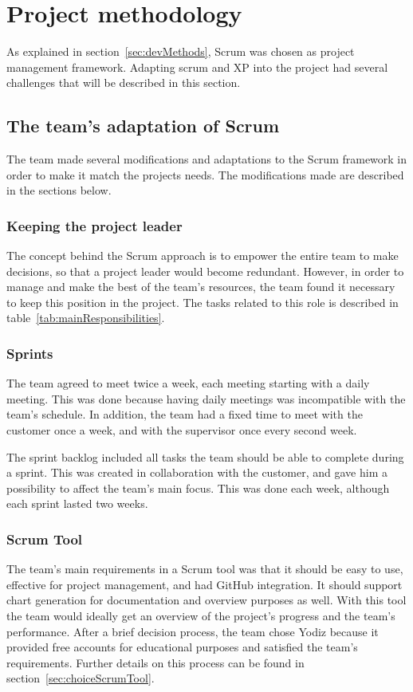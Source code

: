 \newpage
\section{Project methodology}
\label{sec:scrumDevProcess}

As explained in section~\ref{sec:devMethods}, Scrum was chosen as project management framework. Adapting scrum and XP into the project had several challenges that will be described in this section.

\subsection{The team's adaptation of Scrum}
The team made several modifications and adaptations to the Scrum framework in order to make it match the projects needs. The modifications made are described in the sections below.

\subsubsection{Keeping the project leader}
The concept behind the Scrum approach is to empower the entire team to make decisions, so that a project leader would become redundant. However, in order to manage and make the best of the team's resources, the team found it necessary to keep this position in the project. The tasks related to this role is described in table~\ref{tab:mainResponsibilities}.

\subsubsection{Sprints}
The team agreed to meet twice a week, each meeting starting with a daily meeting. This was done because having daily meetings was incompatible with the team's schedule. In addition, the team had a fixed time to meet with the customer once a week, and with the supervisor once every second week.

The sprint backlog included all tasks the team should be able to complete during a sprint. This was created in collaboration with the customer, and gave him a possibility to affect the team's main focus. This was done each week, although each sprint lasted two weeks.

\subsubsection{Scrum Tool}
\label{sec:scrumtool}
The team's main requirements in a Scrum tool was that it should be easy to use, effective for project management, and had GitHub integration. It should support chart generation for documentation and overview purposes as well. With this tool the team would ideally get an overview of the project's progress and the team's performance. After a brief decision process, the team chose Yodiz because it provided free accounts for educational purposes and satisfied the team's requirements. Further details on this process can be found in section~\ref{sec:choiceScrumTool}.

